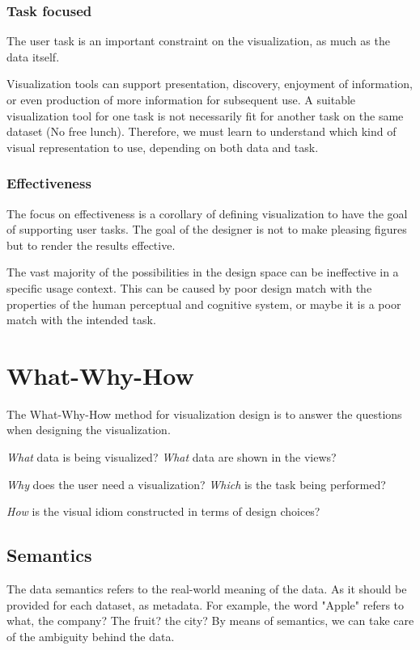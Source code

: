 \subsubsection{Task focused}
The user task is an important constraint on the visualization, as much as the data itself. \par
Visualization tools can support presentation, discovery, enjoyment of information, or even production of more information for subsequent use. A suitable visualization tool for one task is not necessarily fit for another task on the same dataset (No free lunch). Therefore, we must learn to understand which kind of visual representation to use, depending on both data and task.\par

\subsubsection{Effectiveness}
The focus on effectiveness is a corollary of defining visualization to have the goal of supporting user tasks. The goal of the designer is not to make pleasing figures but to render the results effective.\par
The vast majority of the possibilities in the design space can be ineffective in a specific usage context. This can be caused by poor design match with the properties of the human perceptual and cognitive system, or maybe it is a poor match with the intended task. 

\section{What-Why-How}
The What-Why-How method for visualization design is to answer the questions when designing the visualization.\par
\emph{What} data is being visualized? \emph{What} data are shown in the views?\par
\emph{Why} does the user need a visualization? \emph{Which} is the task being performed? \par
\emph{How} is the visual idiom constructed in terms of design choices?\par


\subsection{Semantics}
The data semantics refers to the real-world meaning of the data. As it should be provided for each dataset, as metadata. For example, the word "Apple" refers to what, the company? The fruit? the city? By means of semantics, we can take care of the ambiguity behind the data.

